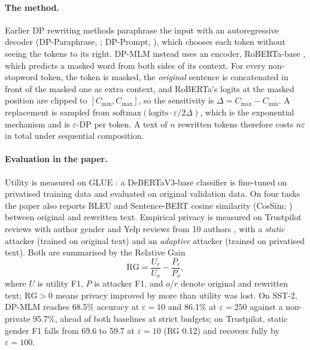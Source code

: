 \documentclass[11pt]{article}
\begin{document}
\paragraph{The method.} Earlier DP rewriting methods paraphrase the input with an autoregressive decoder (DP-Paraphrase, \citealp{mattern-etal-2022-limits}; DP-Prompt, \citealp{utpala2023locally}), which chooses each token without seeing the tokens to its right. DP-MLM instead uses an encoder, RoBERTa-base \citep{liu2019roberta}, which predicts a masked word from both sides of its context. For every non-stopword token, the token is masked, the \emph{original} sentence is concatenated in front of the masked one as extra context, and RoBERTa's logits at the masked position are clipped to $[C_{\min}, C_{\max}]$, so the sensitivity is $\Delta = C_{\max}-C_{\min}$. A replacement is sampled from $\mathrm{softmax}(\text{logits}\cdot\varepsilon/2\Delta)$, which is the exponential mechanism \citep{mcsherry2007mechanism} and is $\varepsilon$-DP per token. A text of $n$ rewritten tokens therefore costs $n\varepsilon$ in total under sequential composition.

\paragraph{Evaluation in the paper.} Utility is measured on GLUE \citep{wang-etal-2018-glue}: a DeBERTaV3-base classifier \citep{he2021debertav3} is fine-tuned on privatised training data and evaluated on original validation data. On four tasks the paper also reports BLEU \citep{papineni-etal-2002-bleu} and Sentence-BERT cosine similarity (CosSim; \citealp{reimers-gurevych-2019-sentence}) between original and rewritten text. Empirical privacy is measured on Trustpilot reviews with author gender \citep{hovy-etal-2015-user} and Yelp reviews from 10 authors \citep{utpala2023locally}, with a \emph{static} attacker (trained on original text) and an \emph{adaptive} attacker (trained on privatised text). Both are summarised by the Relative Gain
\begin{equation}
\mathrm{RG} = \frac{U_r}{U_o} - \frac{P_r}{P_o},
\label{eq:rg}
\end{equation}
where $U$ is utility F1, $P$ is attacker F1, and $o$/$r$ denote original and rewritten text; $\mathrm{RG}>0$ means privacy improved by more than utility was lost. On SST-2, DP-MLM reaches 68.5\% accuracy at $\varepsilon=10$ and 86.1\% at $\varepsilon=250$ against a non-private 95.7\%, ahead of both baselines at strict budgets; on Trustpilot, static gender F1 falls from 69.6 to 59.7 at $\varepsilon=10$ (RG 0.12) and recovers fully by $\varepsilon=100$.
\end{document}
